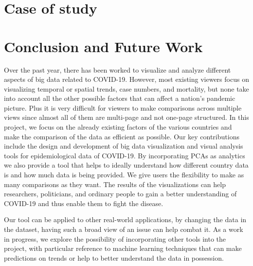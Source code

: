 \documentclass[10pt,conference]{IEEEtran}
\begin{document}
\section{Case of study}

\section{Conclusion and Future Work}
Over the past year, there has been worked to visualize and analyze different aspects of big data related to COVID-19. However, most existing viewers focus on visualizing temporal or spatial trends, case numbers, and mortality, but none take into account all the other possible factors that can affect a nation's pandemic picture. Plus it is very difficult for viewers to make comparisons across multiple views since almost all of them are multi-page and not one-page structured. In this project, we focus on the already existing factors of the various countries and make the comparison of the data as efficient as possible. Our key contributions include the design and development of big data visualization and visual analysis tools for epidemiological data of COVID-19. By incorporating PCAs as analytics we also provide a tool that helps to ideally understand how different country data is and how much data is being provided. We give users the flexibility to make as many comparisons as they want. The results of the visualizations can help researchers, politicians, and ordinary people to gain a better understanding of COVID-19 and thus enable them to fight the disease.

Our tool can be applied to other real-world applications, by changing the data in the dataset, having such a broad view of an issue can help combat it. As a work in progress, we explore the possibility of incorporating other tools into the project, with particular reference to machine learning techniques that can make predictions on trends or help to better understand the data in possession.
\end{document}
